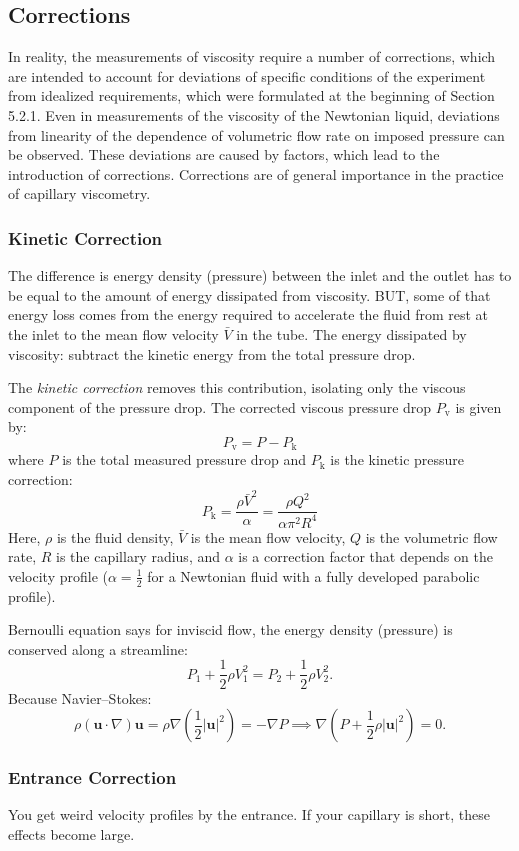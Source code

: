 \subsection{Corrections}
In reality, the measurements of viscosity require a number of corrections, which are intended to account for deviations of specific conditions of the experiment from idealized requirements, which were formulated at the beginning of Section 5.2.1. Even in measurements of the viscosity of the Newtonian liquid, deviations from linearity of the dependence of volumetric flow rate on imposed pressure can be observed. These deviations are caused by factors, which lead to the introduction of corrections. Corrections are of general importance in the practice of capillary viscometry.

\subsubsection{Kinetic Correction}
The difference is energy density (pressure) between the inlet and the outlet has to be equal to the amount of energy dissipated from viscosity. 
BUT, some of that energy loss comes from the energy required to accelerate the fluid from rest at the inlet to the mean flow velocity $\bar{V}$ in the tube. 
The energy dissipated by viscosity: subtract the kinetic energy from the total pressure drop.

The \emph{kinetic correction} removes this contribution, isolating only the viscous component of the pressure
drop. The corrected viscous pressure drop $P_{\text{v}}$ is given by:
\[
    P_{\text{v}} = P - P_{\text{k}}
\]
where $P$ is the total measured pressure drop and $P_{\text{k}}$ is the kinetic pressure correction:
\[
    P_{\text{k}} = \frac{\rho \bar{V}^2}{\alpha} = \frac{\rho Q^2}{\alpha \pi^2 R^4}
\]
Here, $\rho$ is the fluid density, $\bar{V}$ is the mean flow velocity, $Q$ is the volumetric flow rate,
$R$ is the capillary radius, and $\alpha$ is a correction factor that depends on the velocity profile
($\alpha = \frac{1}{2}$ for a Newtonian fluid with a fully developed parabolic profile).

Bernoulli equation says for inviscid flow, the energy density (pressure) is conserved along a streamline:
\[
	P_1 + \frac{1}{2}\rho V_1^2 = P_2 + \frac{1}{2}\rho V_2^2.
\]
Because Navier--Stokes:
\[
	\rho(\mathbf{u}\cdot\nabla)\mathbf{u} =
	\rho\nabla\left(\frac{1}{2}|\mathbf{u}|^2\right) = -\nabla P
	\implies
	\nabla (P + \frac{1}{2}\rho |\mathbf{u}|^2) = 0.
\]


\subsubsection{Entrance Correction}
You get weird velocity profiles by the entrance. If your capillary is short, these effects become large.

